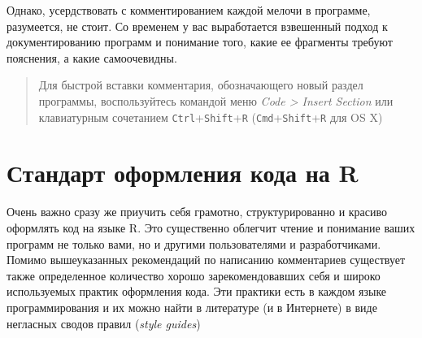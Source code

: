 \documentclass[]{book}
\newenvironment{Shaded}{\begin{snugshade}}{\end{snugshade}}
\newcommand{\DecValTok}[1]{\textcolor[rgb]{0.00,0.00,0.81}{#1}}
\newcommand{\StringTok}[1]{\textcolor[rgb]{0.31,0.60,0.02}{#1}}
\newcommand{\CommentTok}[1]{\textcolor[rgb]{0.56,0.35,0.01}{\textit{#1}}}
\newcommand{\OperatorTok}[1]{\textcolor[rgb]{0.81,0.36,0.00}{\textbf{#1}}}
\newcommand{\NormalTok}[1]{#1}
\begin{document}
\begin{Shaded}
\end{Shaded}

Однако, усердствовать с комментированием каждой мелочи в программе,
разумеется, не стоит. Со временем у вас выработается взвешенный подход к
документированию программ и понимание того, какие ее фрагменты требуют
пояснения, а какие самоочевидны.

\begin{quote}
Для быстрой вставки комментария, обозначающего новый раздел программы,
воспользуйтесь командой меню \emph{Code \textgreater{} Insert Section}
или клавиатурным сочетанием \texttt{Ctrl}+\texttt{Shift}+\texttt{R}
(\texttt{Cmd}+\texttt{Shift}+\texttt{R} для OS X)
\end{quote}

\section*{Стандарт оформления кода на R}\label{----r}

Очень важно сразу же приучить себя грамотно, структурированно и красиво
оформлять код на языке R. Это существенно облегчит чтение и понимание
ваших программ не только вами, но и другими пользователями и
разработчиками. Помимо вышеуказанных рекомендаций по написанию
комментариев существует также определенное количество хорошо
зарекомендовавших себя и широко используемых практик оформления кода.
Эти практики есть в каждом языке программирования и их можно найти в
литературе (и в Интернете) в виде негласных сводов правил (\emph{style
guides})
\end{document}
